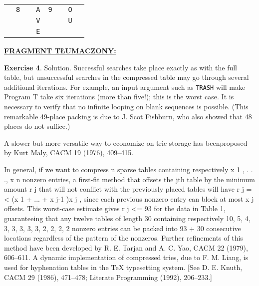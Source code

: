 \begin{table}
\begin{threeparttable}
{\begin{tabularx}{0.575\textwidth}{C{5.4}|C{1.2}|C{1.2}|C{1.2}|C{1.2}|C{1.2}|C{1.2}|C{1.2}}
					& \texttt{8} & & \texttt{A} & \texttt{9} & & \texttt{O} & \\
					
					& & & \texttt{V} & & & \texttt{U} & \\
					& & & \texttt{E} & & & & \\
					\hline
				\end{tabularx}
			}
			
		\end{threeparttable}
	\end{table}
	
	\ifsourcematerial
	\begin{displayquote}
		\color{ao(english)}
		\underline{\textbf{FRAGMENT TŁUMACZONY:}} \newline
		
		\textbf{Exercise 4}. Solution. Successful searches take place exactly as with the full table, but
		unsuccessful searches in the compressed table may go through several
		additional iterations. For example, an input argument such as \texttt{TRASH} will
		make Program T take six iterations (more than five!); this is the worst case. It
		is necessary to verify that no infinite looping on blank sequences is possible.
		(This remarkable 49-place packing is due to J. Scot Fishburn, who also showed
		that 48 places do not suffice.)
		
		A slower but more versatile way to economize on trie storage has beenproposed by Kurt Maly, CACM 19 (1976), 409–415.
		
		In general, if we want to compress n sparse tables containing respectively
		x 1 , . . ., x n nonzero entries, a first-fit method that offsets the jth table by the
		minimum amount r j that will not conflict with the previously placed tables
		will have r j =< (x 1 + ... + x j-1 )x j , since each previous nonzero entry can block
		at most x j offsets. This worst-case estimate gives r j <= 93 for the data in Table
		1, guaranteeing that any twelve tables of length 30 containing respectively 10,
		5, 4, 3, 3, 3, 3, 3, 2, 2, 2, 2 nonzero entries can be packed into 93 + 30
		consecutive locations regardless of the pattern of the nonzeros. Further
		refinements of this method have been developed by R. E. Tarjan and A. C.
		Yao, CACM 22 (1979), 606–611. A dynamic implementation of compressed
		tries, due to F. M. Liang, is used for hyphenation tables in the TeX typesetting
		system. [See D. E. Knuth, CACM 29 (1986), 471–478; Literate Programming
		(1992), 206–233.]
	\end{displayquote}
	\fi
	
